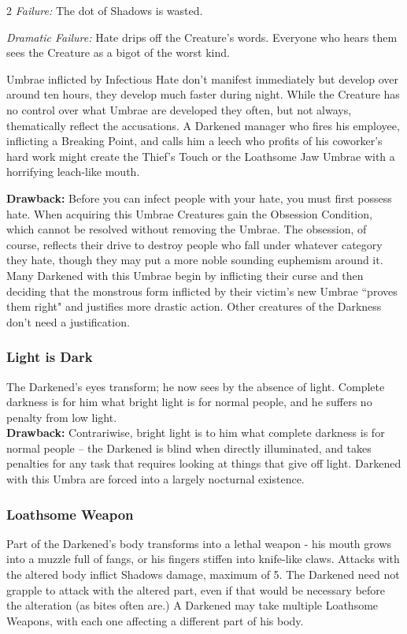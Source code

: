 \begin{multicols}{2}
\textit{Failure:} The dot of Shadows is wasted.

\textit{Dramatic Failure:} Hate drips off the Creature's words. Everyone who hears them sees the Creature as a bigot of the worst kind.

Umbrae inflicted by Infectious Hate don't manifest immediately but develop over around ten hours, they develop much faster during night. While the Creature has no control over what Umbrae are developed they often, but not always, thematically reflect the accusations. A Darkened manager who fires his employee, inflicting a Breaking Point, and calls him a leech who profits of his coworker's hard work might create the Thief's Touch or the Loathsome Jaw Umbrae with a horrifying leach-like mouth.


\noindent  \textbf{Drawback:} Before you can infect people with your hate, you must first possess hate. When acquiring this Umbrae Creatures gain the Obsession Condition, which cannot be resolved without removing the Umbrae. The obsession, of course, reflects their drive to destroy people who fall under whatever category they hate, though they may put a more noble sounding euphemism around it. Many Darkened with this Umbrae begin by inflicting their curse and then deciding that the monstrous form inflicted by their victim's new Umbrae \textquotedblleft proves them right" and justifies more drastic action. Other creatures of the Darkness don't need a justification.

\subsubsection*{Light is Dark}
The Darkened's eyes transform; he now sees by the absence of light. Complete darkness is for him what bright light is for normal people, and he suffers no penalty from low light. \\

\noindent \textbf{Drawback:} Contrariwise, bright light is to him what complete darkness is for normal people -- the Darkened is blind when directly illuminated, and takes penalties for any task that requires looking at things that give off light. Darkened with this Umbra are forced into a largely nocturnal existence. 

\subsubsection*{Loathsome Weapon}

Part of the Darkened's body transforms into a lethal weapon - his mouth grows into a muzzle full of fangs, or his fingers stiffen into knife-like claws. Attacks with the altered body inflict Shadows damage, maximum of 5. The Darkened need not grapple to attack with the altered part, even if that would be necessary before the alteration (as bites often are.) A Darkened may take multiple Loathsome Weapons, with each one affecting a different part of his body. \\


\end{multicols}
